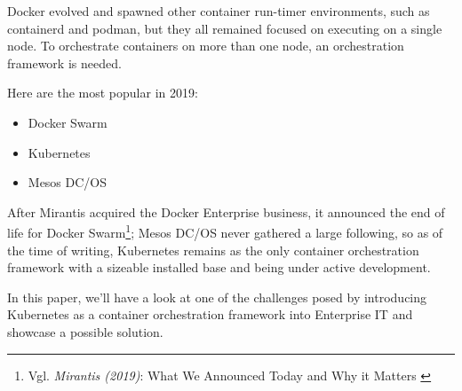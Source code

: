 Docker evolved and spawned other container run-timer environments, such as containerd and podman, but they all remained focused on executing on a single node. To orchestrate containers on more than one node, an orchestration framework is needed. 

Here are the most popular in 2019:
\begin{itemize}
\item Docker Swarm
\item Kubernetes
\item Mesos DC/OS
\end{itemize}

After Mirantis acquired the Docker Enterprise business, it announced the end of life for Docker Swarm\footnote{Vgl. \textit{Mirantis (2019)}: What We Announced Today and Why it Matters \cite{mirantisDocker}}; Mesos DC/OS never gathered a large following, so as of the time of writing, Kubernetes remains as the only container orchestration framework with a sizeable installed base and being under active development.

In this paper, we'll have a look at one of the challenges posed by introducing Kubernetes as a container orchestration framework into Enterprise IT and showcase a possible solution.
